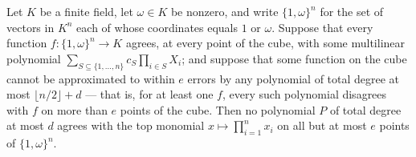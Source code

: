 \begin{theorem}
\label{RazborovSmolensky.no_low_degree_rootProd_approx}
\leanok
{}
Let $K$ be a finite field, let $\omega \in K$ be nonzero, and write $\{1,\omega\}^n$ for
the set of vectors in $K^n$ each of whose coordinates equals $1$ or $\omega$. Suppose
that every function $f : \{1,\omega\}^n \to K$ agrees, at every point of the cube, with
some multilinear polynomial $\sum_{S \subseteq \{1,\dots,n\}} c_S \prod_{i \in S} X_i$;
and suppose that some function on the cube cannot be approximated to within $e$ errors
by any polynomial of total degree at most $\lfloor n/2 \rfloor + d$ — that is, for at
least one $f$, every such polynomial disagrees with $f$ on more than $e$ points of the
cube. Then no polynomial $P$ of total degree at most $d$ agrees with the top monomial $x
\mapsto \prod_{i=1}^{n} x_i$ on all but at most $e$ points of $\{1,\omega\}^n$.
\end{theorem}

